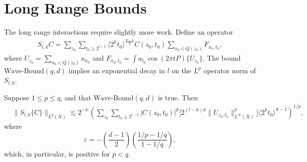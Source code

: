 \section{Long Range Bounds}

The long range interactions require slightly more work. Define an operator
%
\begin{align*}
    S_{l,k} C = \sum\nolimits_{z_0} \sum\nolimits_{t_0 \geq 2^{l-k}} \langle 2^k t_0 \rangle^{\frac{d-1}{2}} C(z_0,t_0) \sum\nolimits_{x_0 \in Q(z_0)} F_{x_0,t_0},
\end{align*}
%
where $U_{z_0} = \sum_{x_0 \in Q(z_0)} u_{x_0}$ and $F_{x_0,t_0} = \int a_{t_0} \cos(2 \pi t P) \{ U_{z_0} \}$. The bound $\text{Wave-Bound}(q,d)$ implies an exponential decay in $l$ on the $L^p$ operator norm of $S_{l,k}$.

\begin{lemma} \label{lemma:scaleupbound}
    Suppose $1 \leq p \leq q$, and that $\text{Wave-Bound}(q,d)$ is true. Then
    \begin{align*}
        &\| S_{l,k} \{ C \} \|_{L^p(X)}  \lesssim 2^{- l \varepsilon} \left( \sum\nolimits_{z_0} \sum\nolimits_{t_0 \geq 2^{l-k}} |C(z_0,t_0)|^p \big[ 2^{(l-k)d} \| U_{z_0,t_0} \|_{L^\infty(X)}^p \big] \langle 2^k t_0 \rangle^{d-1} \right)^{1/p},
    \end{align*}
    where
    \[ \varepsilon = - \left( \frac{d-1}{2} \right) \left( \frac{1/p - 1/q}{1 - 1/q} \right), \]
    which, in particular, is positive for $p < q$.
\end{lemma}
